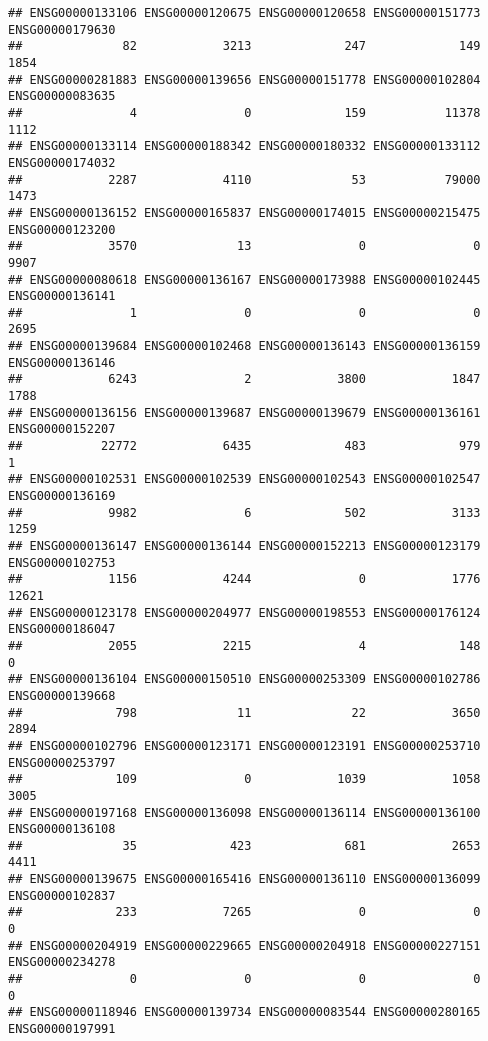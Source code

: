 \documentclass[
]{article}
\begin{document}
\begin{verbatim}
## ENSG00000133106 ENSG00000120675 ENSG00000120658 ENSG00000151773 ENSG00000179630 
##              82            3213             247             149            1854 
## ENSG00000281883 ENSG00000139656 ENSG00000151778 ENSG00000102804 ENSG00000083635 
##               4               0             159           11378            1112 
## ENSG00000133114 ENSG00000188342 ENSG00000180332 ENSG00000133112 ENSG00000174032 
##            2287            4110              53           79000            1473 
## ENSG00000136152 ENSG00000165837 ENSG00000174015 ENSG00000215475 ENSG00000123200 
##            3570              13               0               0            9907 
## ENSG00000080618 ENSG00000136167 ENSG00000173988 ENSG00000102445 ENSG00000136141 
##               1               0               0               0            2695 
## ENSG00000139684 ENSG00000102468 ENSG00000136143 ENSG00000136159 ENSG00000136146 
##            6243               2            3800            1847            1788 
## ENSG00000136156 ENSG00000139687 ENSG00000139679 ENSG00000136161 ENSG00000152207 
##           22772            6435             483             979               1 
## ENSG00000102531 ENSG00000102539 ENSG00000102543 ENSG00000102547 ENSG00000136169 
##            9982               6             502            3133            1259 
## ENSG00000136147 ENSG00000136144 ENSG00000152213 ENSG00000123179 ENSG00000102753 
##            1156            4244               0            1776           12621 
## ENSG00000123178 ENSG00000204977 ENSG00000198553 ENSG00000176124 ENSG00000186047 
##            2055            2215               4             148               0 
## ENSG00000136104 ENSG00000150510 ENSG00000253309 ENSG00000102786 ENSG00000139668 
##             798              11              22            3650            2894 
## ENSG00000102796 ENSG00000123171 ENSG00000123191 ENSG00000253710 ENSG00000253797 
##             109               0            1039            1058            3005 
## ENSG00000197168 ENSG00000136098 ENSG00000136114 ENSG00000136100 ENSG00000136108 
##              35             423             681            2653            4411 
## ENSG00000139675 ENSG00000165416 ENSG00000136110 ENSG00000136099 ENSG00000102837 
##             233            7265               0               0               0 
## ENSG00000204919 ENSG00000229665 ENSG00000204918 ENSG00000227151 ENSG00000234278 
##               0               0               0               0               0 
## ENSG00000118946 ENSG00000139734 ENSG00000083544 ENSG00000280165 ENSG00000197991 

\end{verbatim}
\end{document}
